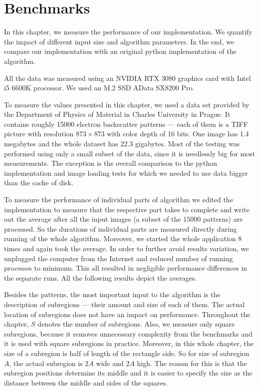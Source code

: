 \chapter{Benchmarks}
\label{chap3}

In this chapter, we measure the performance of our implementation. We quantify the impact of different input size and algorithm parameters. In the end, we compare our implementation with an original python implementation of the algorithm.

All the data was measured using an NVIDIA RTX 3080 graphics card with Intel i5 6600K processor. We used an M.2 SSD AData SX8200 Pro.

To measure the values presented in this chapter, we used a data set provided by the Department of Physics of Material in Charles University in Prague. It contains roughly 15000 electron backscatter patterns --- each of them is a TIFF picture with resolution $873 \times 873$ with color depth of 16 bits. One image has 1.4 megabytes and the whole dataset has 22.3 gigabytes. Most of the testing was performed using only a small subset of the data, since it is needlessly big for most measurements. The exception is the overall comparison to the python implementation and image loading tests for which we needed to use data bigger than the cache of disk.

To measure the performance of individual parts of algorithm we edited the implementation to measure that the respective part takes to complete and write out the average after all the input images (a subset of the 15000 patterns) are processed. So the durations of individual parts are measured directly during running of the whole algorithm. Moreover, we started the whole application 8 times and again took the average. In order to further avoid results variation, we unplugged the computer from the Internet and reduced number of running processes to minimum. This all resulted in negligible performance differences in the separate runs. All the following results depict the averages.

Besides the patterns, the most important input to the algorithm is the description of subregions --- their amount and size of each of them. The actual location of subregions does not have an impact on performance. Throughout the chapter, $S$ denotes the number of subregions. Also, we measure only square subregions, because it removes unnecessary complexity from the benchmarks and it is used with square subregions in practice. Moreover, in this whole chapter, the size of a subregion is half of length of the rectangle side. So for size of subregion $A$, the actual subregion is $2A$ wide and $2A$ high. The reason for this is that the subregion positions determine its middle and it is easier to specify the size as the distance between the middle and sides of the squares.

